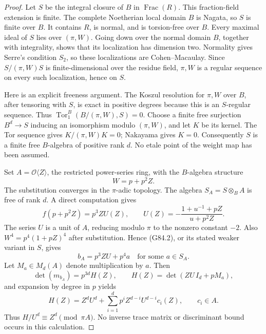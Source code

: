 \begin{proof}
Let \(S\) be the integral closure of \(B\) in
\(\operatorname{Frac}(R)\). This fraction-field extension is finite.
The complete Noetherian local domain \(B\) is Nagata, so \(S\)
is finite over \(B\). It contains \(R\), is normal, and is
torsion-free over \(B\).
Every maximal ideal of \(S\) lies over \((\pi,W)\).
Going down over the normal domain \(B\), together with integrality,
shows that its localization has dimension two.
Normality gives Serre's condition \(S_2\), so these localizations
are Cohen--Macaulay. Since \(S/(\pi,W)S\) is finite-dimensional
over the residue field, \(\pi,W\) is a regular sequence on every
such localization, hence on \(S\).

Here is an explicit freeness argument. The Koszul resolution for
\(\pi,W\) over \(B\), after tensoring with \(S\), is exact in
positive degrees because this is an \(S\)-regular sequence. Thus
\(\operatorname{Tor}_1^B(B/(\pi,W),S)=0\).
Choose a finite free surjection \(B^d\to S\) inducing an isomorphism
modulo \((\pi,W)\), and let \(K\) be its kernel. The Tor sequence
gives \(K/(\pi,W)K=0\); Nakayama gives \(K=0\).
Consequently \(S\) is a finite free \(B\)-algebra of positive rank
\(d\). No etale point of the weight map has been assumed.

Set \(A=\mathcal O\langle Z\rangle\), the restricted power-series
ring, with the \(B\)-algebra structure
\[
 W=p+p^2Z.
 \tag{G84.4}
\]
The substitution converges in the \(\pi\)-adic topology.
The algebra \(S_A=S\otimes_B A\) is free of rank \(d\).
A direct computation gives
\[
 f(p+p^2Z)=p^3ZU(Z),\qquad
 U(Z)=-\frac{1+u^{-1}+pZ}{u+p^2Z}.
 \tag{G84.5}
\]
The series \(U\) is a unit of \(A\), reducing modulo \(\pi\)
to the nonzero constant \(-2\).
Also \(W^4=p^4(1+pZ)^4\) after substitution.
Hence (G84.2), or its stated weaker variant in \(S\), gives
\[
 b_A=p^3ZU+p^4a\quad\text{for some }a\in S_A.
 \tag{G84.6}
\]
Let \(M_a\in M_d(A)\) denote multiplication by \(a\). Then
\[
 \det(m_{b_A})=p^{3d}H(Z),\qquad
 H(Z)=\det(ZU\,I_d+pM_a),
 \tag{G84.7}
\]
and expansion by degree in \(p\) yields
\[
 H(Z)=Z^dU^d+
 \sum_{i=1}^d p^iZ^{d-i}U^{d-i}c_i(Z),\qquad c_i\in A.
 \tag{G84.8}
\]
Thus \(H/U^d\equiv Z^d\pmod{\pi A}\). No inverse trace matrix
or discriminant bound occurs in this calculation.


\end{proof}
